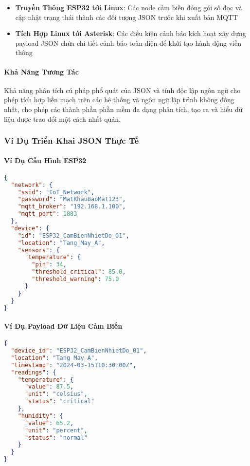 \begin{itemize}
    \item \textbf{Truyền Thông ESP32 tới Linux}: Các node cảm biến đóng gói số đọc và cập nhật trạng thái thành các đối tượng JSON trước khi xuất bản MQTT
    \item \textbf{Tích Hợp Linux tới Asterisk}: Các điều kiện cảnh báo kích hoạt xây dựng payload JSON chứa chi tiết cảnh báo toàn diện để khởi tạo hành động viễn thông
\end{itemize}

\paragraph{Khả Năng Tương Tác}
Khả năng phân tích cú pháp phổ quát của JSON và tính độc lập ngôn ngữ cho phép tích hợp liền mạch trên các hệ thống và ngôn ngữ lập trình không đồng nhất, cho phép các thành phần phần mềm đa dạng phân tích, tạo ra và hiểu dữ liệu được trao đổi một cách nhất quán.

\subsubsection{Ví Dụ Triển Khai JSON Thực Tế}
\label{subsubsec:json_examples}

\paragraph{Ví Dụ Cấu Hình ESP32}
\begin{lstlisting}[language=json, caption=Cấu Hình Thiết Bị ESP32, label=lst:esp32_config]
{
  "network": {
    "ssid": "IoT_Network",
    "password": "MatKhauBaoMat123",
    "mqtt_broker": "192.168.1.100",
    "mqtt_port": 1883
  },
  "device": {
    "id": "ESP32_CamBienNhietDo_01",
    "location": "Tang_May_A",
    "sensors": {
      "temperature": {
        "pin": 34,
        "threshold_critical": 85.0,
        "threshold_warning": 75.0
      }
    }
  }
}
\end{lstlisting}

\paragraph{Ví Dụ Payload Dữ Liệu Cảm Biến}
\begin{lstlisting}[language=json, caption=Payload Dữ Liệu Cảm Biến MQTT, label=lst:sensor_payload]
{
  "device_id": "ESP32_CamBienNhietDo_01",
  "location": "Tang_May_A",
  "timestamp": "2024-03-15T10:30:00Z",
  "readings": {
    "temperature": {
      "value": 87.5,
      "unit": "celsius",
      "status": "critical"
    },
    "humidity": {
      "value": 65.2,
      "unit": "percent", 
      "status": "normal"
    }
  }
}
\end{lstlisting}

